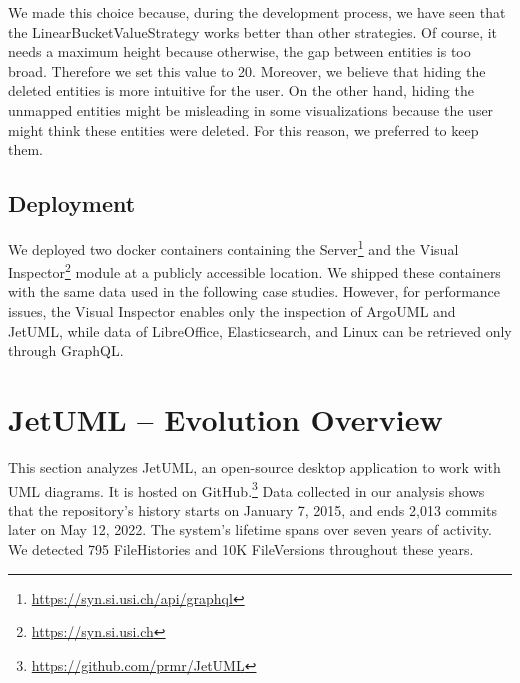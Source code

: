 We made this choice because, during the development process, we have seen that the LinearBucketValueStrategy works better than other strategies. Of course, it needs a maximum height because otherwise, the gap between entities is too broad. Therefore we set this value to 20. Moreover, we believe that hiding the deleted entities is more intuitive for the user. On the other hand, hiding the unmapped entities might be misleading in some visualizations because the user might think these entities were deleted. For this reason, we preferred to keep them. 

\subsection*{Deployment}
We deployed two docker containers containing the Server\footnote{\url{https://syn.si.usi.ch/api/graphql}} and the Visual Inspector\footnote{\url{https://syn.si.usi.ch}} module at a publicly accessible location. We shipped these containers with the same data used in the following case studies. However, for performance issues, the Visual Inspector enables only the inspection of ArgoUML and JetUML, while data of LibreOffice, Elasticsearch, and Linux can be retrieved only through GraphQL. 


\newpage
\section{JetUML – Evolution Overview}
This section analyzes JetUML, an open-source desktop application to work with UML diagrams. It is hosted on GitHub.\footnote{\url{https://github.com/prmr/JetUML}} Data collected in our analysis shows that the repository's history starts on January 7, 2015, and ends 2,013 commits later on May 12, 2022. The system's lifetime spans over seven years of activity. We detected 795 FileHistories and 10K FileVersions throughout these years.

